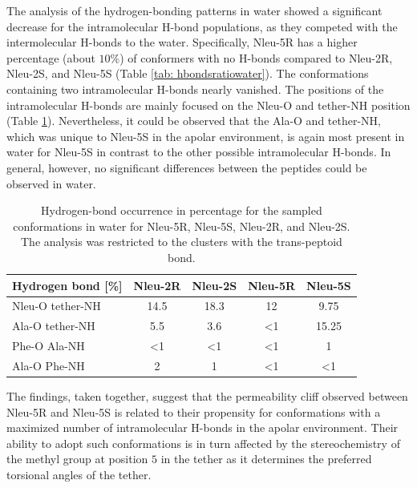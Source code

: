 The analysis of the hydrogen-bonding patterns in water showed a significant decrease for the intramolecular H-bond populations, as they competed with the intermolecular H-bonds to the water. Specifically, Nleu-5R has a higher percentage (about $10\%$) of conformers with no H-bonds compared to Nleu-2R, Nleu-2S, and Nleu-5S (Table \ref{tab: hbondsratiowater}). The conformations containing two intramolecular H-bonds nearly vanished.
The positions of the intramolecular H-bonds are mainly focused on the Nleu-O and tether-NH position (Table \ref{tab: SIhbondRatiosWater}).
Nevertheless, it could be observed that the Ala-O and tether-NH, which was unique to Nleu-5S in the apolar environment, is again most present in water for Nleu-5S in contrast to the other possible intramolecular H-bonds. 
In general, however, no significant differences between the peptides could be observed in water.

\begin{table}[h!]
\centering
\caption{Hydrogen-bond occurrence in percentage for the sampled conformations in
water for Nleu-5R, Nleu-5S, Nleu-2R, and Nleu-2S. The analysis was restricted to the clusters with the trans-peptoid bond.}
\label{tab: SIhbondRatiosWater}
  \begin{adjustbox}{max width=\textwidth}
  \begin{tabular}{lcccc}
Hydrogen bond {[}\%{]} & Nleu-2R      & Nleu-2S      & Nleu-5R      & Nleu-5S      \\
\hline
Nleu-O tether-NH       & 14.5       & 18.3       &  12           & 9.75        \\
Ala-O tether-NH        & 5.5        & 3.6        & \textless{}1  & 15.25 \\
Phe-O Ala-NH           & \textless{}1 & \textless{}1 & \textless{}1  & 1 \\
Ala-O Phe-NH           & 2            & 1            & \textless{}1  & \textless{}1 \\
    \hline
\end{tabular}%
\end{adjustbox}
\end{table}


\FloatBarrier

The findings, taken together, suggest that the permeability cliff observed between Nleu-5R and Nleu-5S is related to their propensity for conformations with a maximized number of intramolecular H-bonds in the apolar environment. Their ability to adopt such conformations is in turn affected by the stereochemistry of the methyl group at position $5$ in the tether as it determines the preferred torsional angles of the tether.

